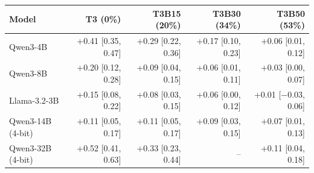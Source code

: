 \begin{tabular}{lrrrr}
\toprule
Model & T3 (0\%) & T3B15 (20\%) & T3B30 (34\%) & T3B50 (53\%) \\
\midrule
Qwen3-4B & +0.41 [0.35, 0.47] & +0.29 [0.22, 0.36] & +0.17 [0.10, 0.23] & +0.06 [0.01, 0.12] \\
Qwen3-8B & +0.20 [0.12, 0.28] & +0.09 [0.04, 0.15] & +0.06 [0.01, 0.11] & +0.03 [0.00, 0.07] \\
Llama-3.2-3B & +0.15 [0.08, 0.22] & +0.08 [0.03, 0.15] & +0.06 [0.00, 0.12] & +0.01 [$-$0.03, 0.06] \\
Qwen3-14B (4-bit) & +0.11 [0.05, 0.17] & +0.11 [0.05, 0.17] & +0.09 [0.03, 0.15] & +0.07 [0.01, 0.13] \\
Qwen3-32B (4-bit) & +0.52 [0.41, 0.63] & +0.33 [0.23, 0.44] & -- & +0.11 [0.04, 0.18] \\
\bottomrule
\end{tabular}
